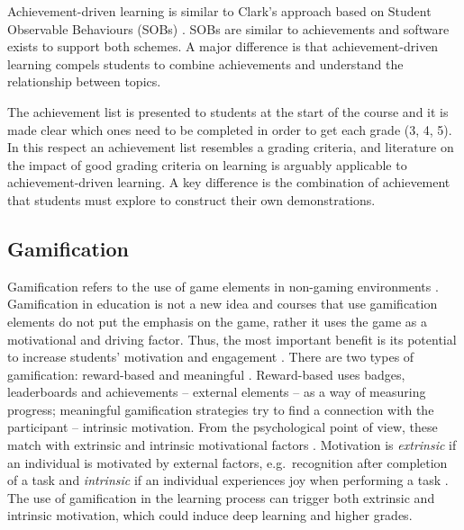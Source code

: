 \documentclass[sigconf]{acmart}
\begin{document}
Achievement-driven learning is similar to Clark's approach based on
Student Observable Behaviours (SOBs) \citep{clark2013}. SOBs are similar
to achievements and software exists to support both schemes. A major
difference is that achievement-driven learning compels students to
combine achievements and understand the relationship between topics.

The achievement list is presented to students at the start of the course
and it is made clear which ones need to be completed in order to get
each grade (3, 4, 5). In this respect an achievement list resembles a
grading criteria, and literature on the impact of good grading criteria
on learning \citep{rustPrice2003} is arguably applicable to
achievement-driven learning. A key difference is the combination of
achievement that students must explore to construct their own
demonstrations.

\hypertarget{gamification}{%
\subsection{Gamification}\label{gamification}}

Gamification refers to the use of game elements in non-gaming
environments \citep{deterding2011game}. Gamification in education is not
a new idea
\citep{huang2013gamification, dicheva2015gamification, gamification-leaderboard-benefits}
and courses that use gamification elements do not put the emphasis on
the game, rather it uses the game as a motivational and driving factor.
Thus, the most important benefit is its potential to increase students'
motivation and engagement
\citep{SEABORN201514, gamification-leaderboard-benefits}. There are two
types of gamification: reward-based and meaningful \citep{oldwine}.
Reward-based uses badges, leaderboards and achievements -- external
elements -- as a way of measuring progress; meaningful gamification
strategies try to find a connection with the participant -- intrinsic
motivation. From the psychological point of view, these match with
extrinsic and intrinsic motivational factors
\citep[\citet{psychologyMotivation},\citet{RYAN200054}]{intrinsic-book}.
Motivation is \textit{extrinsic} if an individual is motivated by
external factors, e.g.~recognition after completion of a task and
\textit{intrinsic} if an individual experiences joy when performing a
task . The use of gamification in the learning process can trigger both
extrinsic and intrinsic motivation, which could induce deep learning and
higher grades.
\end{document}
